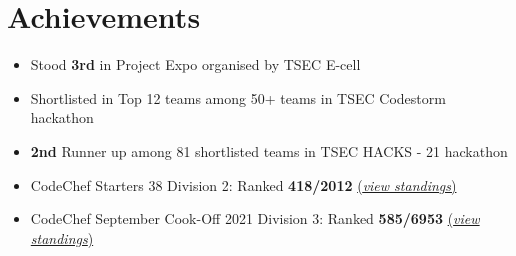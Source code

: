 \documentclass[a4,10pt]{article}
\newenvironment{zitemize}{
\begin{itemize}\itemsep0pt \parskip0pt \parsep1pt}
{\end{itemize}\vspace{-0.5cm}}
\begin{document}
\section{Achievements}
\begin{zitemize}
    
            
        \item Stood \textbf{3rd} in Project Expo organised by TSEC E-cell 
                
        \item Shortlisted in Top 12 teams among  50+ teams in TSEC Codestorm hackathon 
                
        \item \textbf{2nd} Runner up among 81 shortlisted teams in TSEC HACKS - 21 hackathon 
                
        \item  CodeChef Starters 38 Division 2: Ranked \textbf{418/2012} \href{https://www.codechef.com/rankings/START38B?itemsPerPage=100&order=asc&page=21&search=shyren_more&sortBy=rank}{(\textit{view standings})}
            
        \item CodeChef September Cook-Off 2021 Division 3: Ranked \textbf{585/6953} \href{https://www.codechef.com/rankings/COOK133C?order=asc&search=shyren_more&sortBy=rank}{(\textit{view standings})}
        
        \vspace{0.5cm}    
    \end{zitemize}

\end{document}
